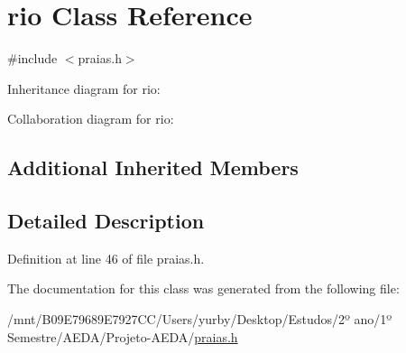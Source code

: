 \hypertarget{classrio}{}\section{rio Class Reference}
\label{classrio}


{\ttfamily \#include $<$praias.\+h$>$}



Inheritance diagram for rio\+:


Collaboration diagram for rio\+:
\subsection*{Additional Inherited Members}


\subsection{Detailed Description}


Definition at line 46 of file praias.\+h.



The documentation for this class was generated from the following file\+:\begin{DoxyCompactItemize}
\item 
/mnt/\+B09\+E79689\+E7927\+C\+C/\+Users/yurby/\+Desktop/\+Estudos/2º ano/1º Semestre/\+A\+E\+D\+A/\+Projeto-\/\+A\+E\+D\+A/\hyperlink{praias_8h}{praias.\+h}\end{DoxyCompactItemize}
